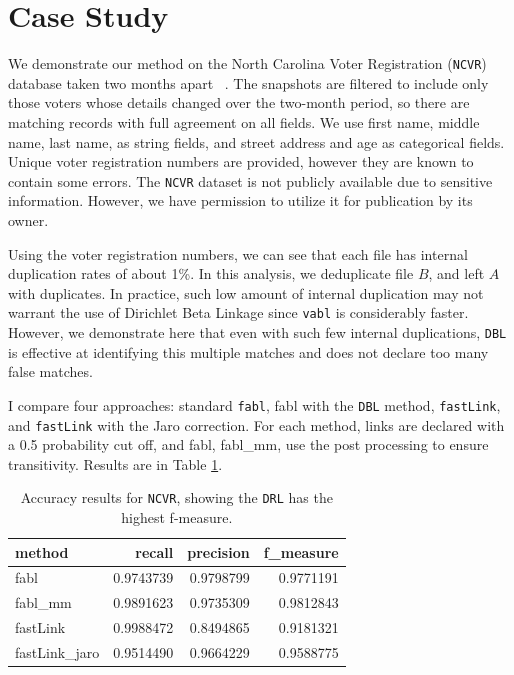 \documentclass[12pt,letterpaper]{article}
\newcommand{\1}[1]{\mathbb{I}\!\left[#1\right]} %
\begin{document}
\section{Case Study}\label{sec:case-study}

We demonstrate our method on the North Carolina Voter Registration (\texttt{NCVR}) database taken two months apart ~\citep{christen_preparation_2014}. The snapshots are filtered to include only those voters whose details changed over the two-month period, so there are matching records with full agreement on all fields. We use first name, middle name, last name, as string fields, and street address and age as categorical fields. Unique voter registration numbers are provided, however they are known to contain some errors. The \texttt{NCVR} dataset is not publicly available due to sensitive information. However, we have permission to utilize it for publication by its owner.

Using the voter registration numbers, we can see that each file has internal duplication rates of about 1\%. In this analysis, we deduplicate file $B$, and left $A$ with duplicates. In practice, such low amount of internal duplication may not warrant the use of Dirichlet Beta Linkage since \texttt{vabl} is considerably faster. However, we demonstrate here that even with such few internal duplications, \texttt{DBL} is effective at identifying this multiple matches and does not declare too many false matches. 

I compare four approaches: standard \texttt{fabl}, fabl with the \texttt{DBL} method, \texttt{fastLink}, and \texttt{fastLink} with the Jaro correction. For each method, links are declared with a 0.5 probability cut off, and fabl, fabl\_mm, use the post processing to ensure transitivity. Results are in Table \ref{table:ncvr_results}.

\begin{table}[t]
	\centering
	\begin{tabular}{l|rrr}
		
		method & recall & precision & f\_measure\\
		\hline
		fabl & 0.9743739 & 0.9798799 & 0.9771191\\
		\hline
		fabl\_mm & 0.9891623 & 0.9735309 & 0.9812843\\
		\hline
		fastLink & 0.9988472 & 0.8494865 & 0.9181321\\
		\hline
		fastLink\_jaro & 0.9514490 & 0.9664229 & 0.9588775\\
	\end{tabular}
	\caption{Accuracy results for \texttt{NCVR}, showing the \texttt{DRL} has the highest f-measure.}
	\label{table:ncvr_results}
\end{table}
\end{document}
